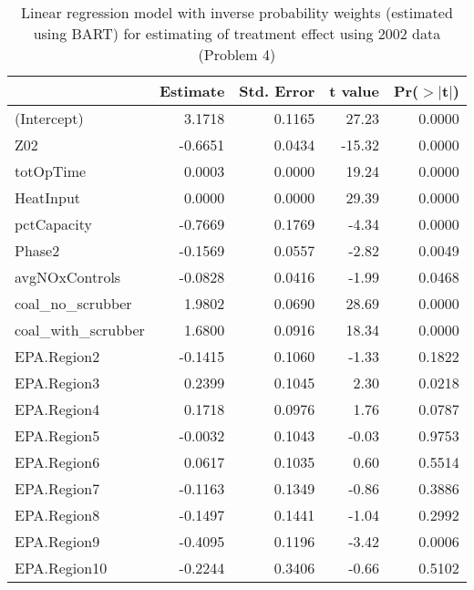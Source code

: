 \begin{table}[ht]
\centering
\begin{tabular}{lrrrr}
  \toprule
 & Estimate & Std. Error & t value & Pr($>$$|$t$|$) \\ 
  \midrule
(Intercept) & 3.1718 & 0.1165 & 27.23 & 0.0000 \\ 
  Z02 & -0.6651 & 0.0434 & -15.32 & 0.0000 \\ 
  totOpTime & 0.0003 & 0.0000 & 19.24 & 0.0000 \\ 
  HeatInput & 0.0000 & 0.0000 & 29.39 & 0.0000 \\ 
  pctCapacity & -0.7669 & 0.1769 & -4.34 & 0.0000 \\ 
  Phase2 & -0.1569 & 0.0557 & -2.82 & 0.0049 \\ 
  avgNOxControls & -0.0828 & 0.0416 & -1.99 & 0.0468 \\ 
  coal\_no\_scrubber & 1.9802 & 0.0690 & 28.69 & 0.0000 \\ 
  coal\_with\_scrubber & 1.6800 & 0.0916 & 18.34 & 0.0000 \\ 
  EPA.Region2 & -0.1415 & 0.1060 & -1.33 & 0.1822 \\ 
  EPA.Region3 & 0.2399 & 0.1045 & 2.30 & 0.0218 \\ 
  EPA.Region4 & 0.1718 & 0.0976 & 1.76 & 0.0787 \\ 
  EPA.Region5 & -0.0032 & 0.1043 & -0.03 & 0.9753 \\ 
  EPA.Region6 & 0.0617 & 0.1035 & 0.60 & 0.5514 \\ 
  EPA.Region7 & -0.1163 & 0.1349 & -0.86 & 0.3886 \\ 
  EPA.Region8 & -0.1497 & 0.1441 & -1.04 & 0.2992 \\ 
  EPA.Region9 & -0.4095 & 0.1196 & -3.42 & 0.0006 \\ 
  EPA.Region10 & -0.2244 & 0.3406 & -0.66 & 0.5102 \\ 
   \bottomrule
\end{tabular}
\caption{Linear regression model with inverse probability weights (estimated using BART) for estimating of treatment effect using 2002 data (Problem 4)} 
\label{tab:lm-2g-02}
\end{table}

